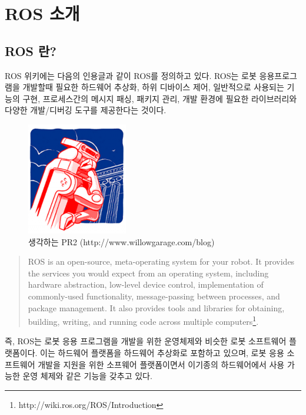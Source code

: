 \section{ROS 소개}

\subsection{ROS 란?}

ROS 위키에는 다음의 인용글과 같이 ROS를 정의하고 있다.
ROS는 로봇 응용프로그램을 개발할때 필요한 하드웨어 추상화, 하위 디바이스 제어, 일반적으로 사용되는 기능의 구현, 프로세스간의 메시지 패싱, 패키지 관리, 개발 환경에 필요한 라이브러리와 다양한 개발/디버깅 도구를 제공한다는 것이다. 

\begin{figure}[h]
\centering\includegraphics[width=0.3\columnwidth]{pictures/chapter1/think_pr2.png}
\caption{생각하는 PR2 (http://www.willowgarage.com/blog)}
\end{figure}

\begin{quote}
ROS is an open-source, meta-operating system for your robot.
It provides the services you would expect from an operating system, including hardware abstraction, low-level device control, implementation of commonly-used functionality, message-passing between processes, and package management.
It also provides tools and libraries for obtaining, building, writing, and running code across multiple computers\footnote{http://wiki.ros.org/ROS/Introduction}.
\end{quote}

즉, ROS는 로봇 응용 프로그램을 개발을 위한 운영체제와 비슷한 로봇 소프트웨어 플랫폼이다.
이는 하드웨어 플랫폼을 하드웨어 추상화로 포함하고 있으며, 로봇 응용 소프트웨어 개발을 지원을 위한 소프웨어 플랫폼이면서 이기종의 하드웨어에서 사용 가능한 운영 체제와 같은 기능을 갖추고 있다.

